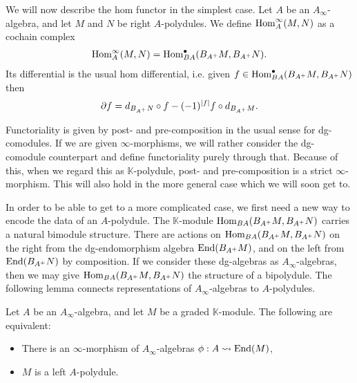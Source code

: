 \documentclass[../thesis.tex]{subfiles}
\begin{document}
            We will now describe the hom functor in the simplest case. Let $A$ be an $A_\infty$-algebra, and let $M$ and $N$ be right $A$-polydules. We define $\tt{Hom}^\infty_A(M, N)$ as a cochain complex
            \begin{align*}
                \tt{Hom}^\infty_A(M,N) = \tt{Hom}_{BA}^\bullet(B_{A^+}M, B_{A^+}N)\tt{.}
            \end{align*}
            Its differential is the usual hom differential, i.e. given $f \in \tt{Hom}_{BA}^\bullet(B_{A^+}M,B_{A^+}N)$ then
            \begin{align*}
                \partial f = d_{B_{A^+}N}\circ f - (-1)^{|f|}f\circ d_{B_{A^+}M}\tt{.}
            \end{align*}

            Functoriality is given by post- and pre-composition in the usual sense for dg-comodules. If we are given $\infty$-morphisms, we will rather consider the dg-comodule counterpart and define functoriality purely through that. Because of this, when we regard this as $\mathbb{K}$-polydule, post- and pre-composition is a strict $\infty$-morphism. This will also hold in the more general case which we will soon get to. 

            In order to be able to get to a more complicated case, we first need a new way to encode the data of an $A$-polydule. The $\mathbb{K}$-module $\tt{Hom}_{BA}(B_{A^+}M,B_{A^+}N)$ carries a natural bimodule structure. There are actions on $\tt{Hom}_{BA}(B_{A^+}M,B_{A^+}N)$ on the right from the dg-endomorphism algebra $\tt{End}(B_{A^+}M)$, and on the left from $\tt{End}(B_{A^+}N)$ by composition. If we consider these dg-algebras as $A_\infty$-algebras, then we may give $\tt{Hom}_{BA}(B_{A^+}M,B_{A^+}N)$ the structure of a bipolydule.  The following lemma connects representations of $A_\infty$-algebras to $A$-polydules.

            \begin{lemma}\label{lem: rep}
                Let $A$ be an $A_\infty$-algebra, and let $M$ be a graded $\mathbb{K}$-module. The following are equivalent:
                \begin{itemize}
                    \item There is an $\infty$-morphism of $A_\infty$-algebras $\phi: A \rightsquigarrow \tt{End}(M)$,
                    \item $M$ is a left $A$-polydule.
                \end{itemize}
            \end{lemma}
\end{document}
